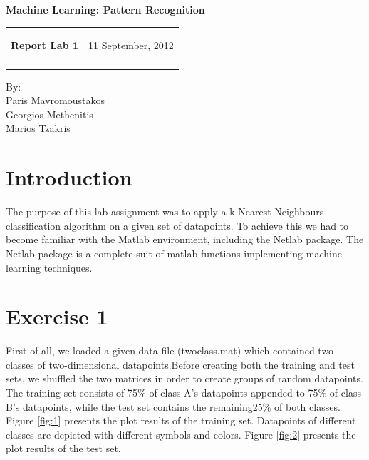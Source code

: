 \documentclass[letterpaper,11pt]{article}
\newcommand{\resheading}[1]{{\large \colorbox{mygrey}{\begin{minipage}{\textwidth}{\textbf{#1 \vphantom{p\^{E}}}}\end{minipage}}}}
\begin{document}
\begin{center}
{\LARGE \textbf{Machine Learning: Pattern Recognition}}\\ [1em]
\end{center}
\newcommand{\mywebheader}{
    \begin{tabular}{@{}p{5in}p{4in}}
		{\resheading{Report Lab 1}} & {\Large 11 September, 2012}\\\vspace{0.2cm}
	    \end{tabular}}
    \mywebheader
    
    	\begin{center}
    	{\Large By:} \\ \vspace{0.1cm}
	    {\Large Paris Mavromoustakos} \\  \vspace{0.1cm}
	    {\Large Georgios Methenitis} \\ \vspace{0.1cm}
	    {\Large Marios Tzakris}
	    \end{center}

  
  \section*{Introduction}
  The purpose of this lab assignment was to apply a k-Nearest-Neighbours classification algorithm on a given set of datapoints. To achieve this we had to become familiar with the Matlab environment, including the Netlab package. The Netlab package is a complete suit of matlab functions implementing machine learning techniques.
 
 \section*{Exercise 1}
 First of all, we loaded a given data file (twoclass.mat) which contained two classes of two-dimensional datapoints.Before creating both the training and test sets, we shuffled the two matrices in order to create groups of random datapoints. The training set consists of 75\% of class A's datapoints appended to 75\% of class B's datapoints, while the test set contains the remaining25\% of both classes. Figure \ref{fig:1} presents the plot results of the training set. Datapoints of different classes are depicted with different symbols and colors. Figure \ref{fig:2} presents the plot results of the test set.
 
\end{document}
